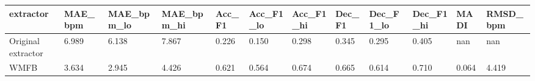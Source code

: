 \begin{tabular}{llllllllllll}
\toprule
extractor & MAE\_bpm & MAE\_bpm\_lo & MAE\_bpm\_hi & Acc\_F1 & Acc\_F1\_lo & Acc\_F1\_hi & Dec\_F1 & Dec\_F1\_lo & Dec\_F1\_hi & MADI & RMSD\_bpm \\
\midrule
Original extractor & 6.989 & 6.138 & 7.867 & 0.226 & 0.150 & 0.298 & 0.345 & 0.295 & 0.405 & nan & nan \\
WMFB & 3.634 & 2.945 & 4.426 & 0.621 & 0.564 & 0.674 & 0.665 & 0.614 & 0.710 & 0.064 & 4.419 \\
\bottomrule
\end{tabular}
